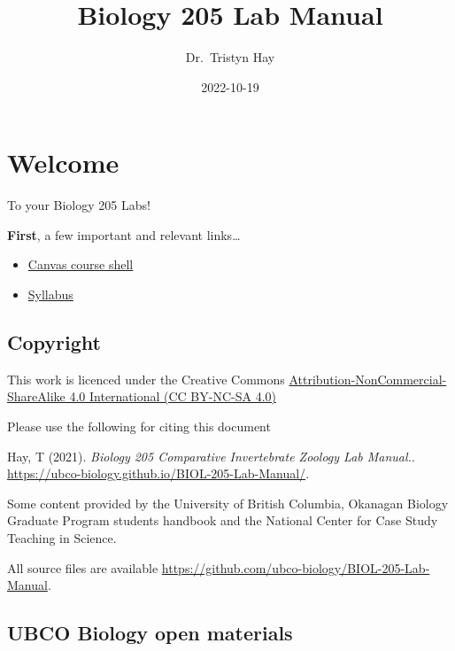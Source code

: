 \documentclass[
]{book}
\title{Biology 205 Lab Manual}
\author{Dr.~Tristyn Hay}
\date{2022-10-19}
\providecommand{\tightlist}{%
  \setlength{\itemsep}{0pt}\setlength{\parskip}{0pt}}
\begin{document}
\maketitle

{
\setcounter{tocdepth}{1}
\tableofcontents
}
\hypertarget{welcome}{%
\chapter*{Welcome}\label{welcome}}

To your Biology 205 Labs!

\textbf{First}, a few important and relevant links\ldots{}

\begin{itemize}
\tightlist
\item
  \href{https://canvas.ubc.ca/courses/113910}{Canvas course shell}
\item
  \href{https://canvas.ubc.ca/courses/113910/files/21718741?module_item_id=4662232}{Syllabus}
\end{itemize}

\hypertarget{copyright}{%
\section*{Copyright}\label{copyright}}

This work is licenced under the Creative Commons \href{https://creativecommons.org/licenses/by-nc-sa/4.0/}{Attribution-NonCommercial-ShareAlike 4.0 International (CC BY-NC-SA 4.0)}

Please use the following for citing this document

Hay, T (2021). \emph{Biology 205 Comparative Invertebrate Zoology Lab Manual.}. \url{https://ubco-biology.github.io/BIOL-205-Lab-Manual/}.

Some content provided by the University of British Columbia, Okanagan Biology Graduate Program students handbook and the National Center for Case Study Teaching in Science.

All source files are available \url{https://github.com/ubco-biology/BIOL-205-Lab-Manual}.

\hypertarget{ubco-biology-open-materials}{%
\section*{UBCO Biology open materials}\label{ubco-biology-open-materials}}
\end{document}
